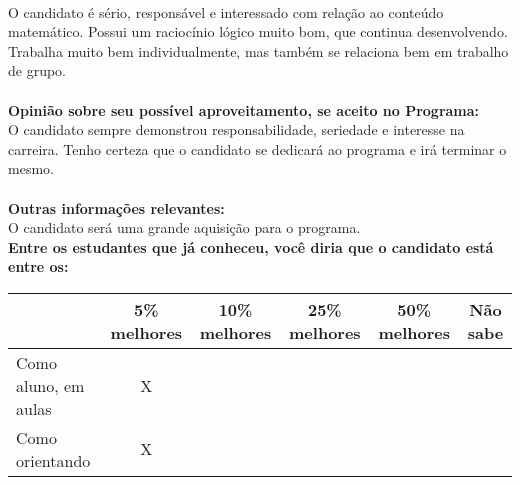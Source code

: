 \documentclass[11pt]{article}
\begin{document}
\\O candidato é sério, responsável e interessado com relação ao conteúdo matemático. Possui um raciocínio lógico muito bom, que continua desenvolvendo. Trabalha muito bem individualmente, mas também se relaciona bem em trabalho de grupo.\\
\\
\textbf{Opinião sobre seu possível aproveitamento, se aceito no Programa:}
\\O candidato sempre demonstrou responsabilidade, seriedade e interesse na carreira. Tenho certeza que o candidato se dedicará ao programa e irá terminar o mesmo.\\ 
\\
\textbf{Outras informações relevantes:} \\O candidato será uma grande aquisição para o programa.
\\[0.3cm]
\textbf{Entre os estudantes que já conheceu, você diria que o candidato está entre os:}
\\
\begin{tabular}{|l|c|c|c|c|c|}
\hline
 & 5\% melhores & 10\% melhores & 25\% melhores & 50\% melhores & Não sabe \\
\hline
Como aluno, em aulas & X &  &  &  & \\
\hline
Como orientando & X &  &  &  & \\
\hline
\end{tabular}
\end{document}
